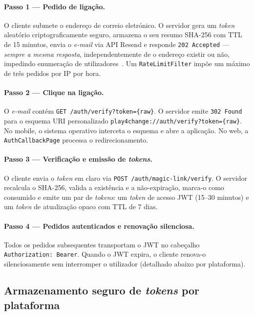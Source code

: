 \paragraph{Passo 1 — Pedido de ligação.}
O cliente submete o endereço de correio eletrónico.
O servidor gera um \textit{token} aleatório criptograficamente seguro,
armazena o seu resumo SHA-256 com TTL de 15 minutos, envia o \textit{e-mail}
via API Resend e responde \texttt{202 Accepted} — \emph{sempre a mesma
resposta}, independentemente de o endereço existir ou não, impedindo
enumeração de utilizadores~\cite{owasp2021a05}.
Um \texttt{RateLimitFilter} impõe um máximo de três pedidos por IP por
hora.

\paragraph{Passo 2 — Clique na ligação.}
O \textit{e-mail} contém \texttt{GET /auth/verify?token=\{raw\}}.
O servidor emite \texttt{302 Found} para o esquema URI personalizado
\texttt{play4change://auth/verify?token=\{raw\}}.
No mobile, o sistema operativo interceta o esquema e abre a aplicação.
No web, a \texttt{AuthCallbackPage} processa o redirecionamento.

\paragraph{Passo 3 — Verificação e emissão de \textit{tokens}.}
O cliente envia o \textit{token} em claro via \texttt{POST /auth/magic-link/verify}.
O servidor recalcula o SHA-256, valida a existência e a não-expiração,
marca-o como consumido e emite um par de \textit{tokens}:
um \textit{token} de acesso JWT (15--30 minutos) e um \textit{token} de
atualização opaco com TTL de 7 dias.

\paragraph{Passo 4 — Pedidos autenticados e renovação silenciosa.}
Todos os pedidos subsequentes transportam o JWT no cabeçalho
\texttt{Authorization: Bearer}.
Quando o JWT expira, o cliente renova-o silenciosamente sem interromper
o utilizador (detalhado abaixo por plataforma).

\subsection*{Armazenamento seguro de \textit{tokens} por plataforma}

